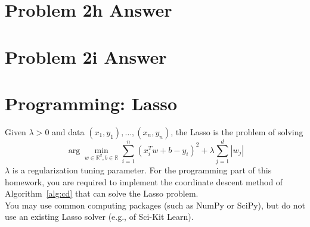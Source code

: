 \documentclass{article}
\newcommand{\field}[1]{\mathbb{#1}}
\newcommand{\1}{\mathbf{1}}
\newcommand{\R}{\field{R}} %
\begin{document}
\section*{Problem 2h Answer}

\section*{Problem 2i Answer}

























\section{Programming: Lasso}

Given $\lambda >0$ and data $(x_1,y_1),\dots,(x_n,y_n)$, the Lasso is the problem of solving
\begin{equation}\label{eq:lasso}
  \arg\min_{{w}\in \R^d, b \in \R} \sum_{i=1}^n { (x_i^T {w} + b - {y}_i)^2 }
    + \lambda \sum_{j=1}^d |{w}_j| 
\end{equation}
$\lambda$ is a regularization tuning parameter.
For the programming part of this homework, you are required to implement the
coordinate descent method of Algorithm~\ref{alg:cd} that can solve the Lasso problem.\\
You may use common computing packages (such as NumPy or SciPy), but do not use an existing Lasso solver (e.g., of Sci-Kit Learn).
\end{document}
